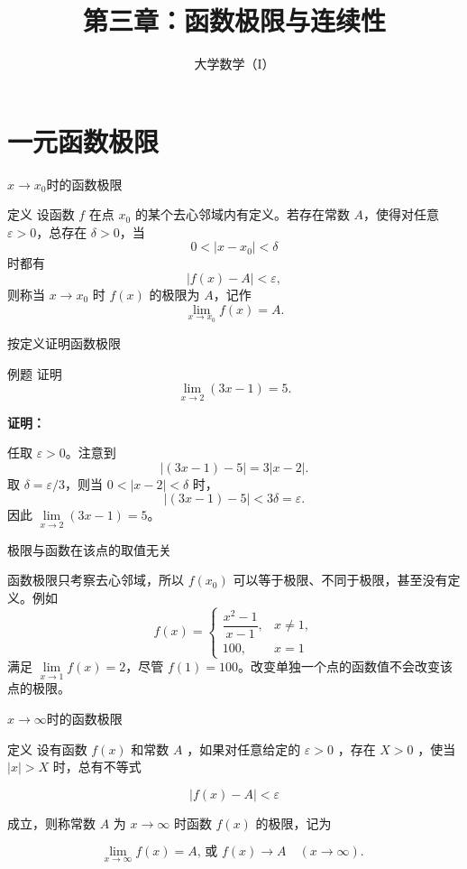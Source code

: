 \documentclass[aspectratio=169,10pt]{ctexbeamer}
\title[第三章：函数极限与连续性]{第三章：函数极限与连续性}
\author[大学数学（I）]{大学数学（I）}
\begin{document}
\begin{frame}[plain]
  \titlepage
\end{frame}






\section{一元函数极限}



\begin{frame}{$x\to x_0$时的函数极限}

	
	\begin{block}{定义}
	设函数 \(f\) 在点 \(x_0\) 的某个去心邻域内有定义。若存在常数 \(A\)，使得对任意 \(\varepsilon>0\)，总存在 \(\delta>0\)，当
	\[
	0<|x-x_0|<\delta
	\]
	时都有
	\[
	|f(x)-A|<\varepsilon,
	\]
	则称当 \(x\to x_0\) 时 \(f(x)\) 的极限为 \(A\)，记作
	\[
	\lim\limits_{x\to x_0}f(x)=A.
	\]
	\end{block}

\end{frame}

\begin{frame}{按定义证明函数极限}
	\begin{block}{例题}
	证明
	\[
	\lim\limits_{x\to2}(3x-1)=5.
	\]
	\end{block}
	\pause
	\textbf{证明：}
	
	任取 \(\varepsilon>0\)。注意到
	\[
	|(3x-1)-5|=3|x-2|.
	\]
	取 \(\delta=\varepsilon/3\)，则当 \(0<|x-2|<\delta\) 时，
	\[
	|(3x-1)-5|<3\delta=\varepsilon.
	\]
	因此 \(\lim\limits_{x\to2}(3x-1)=5\)。
	

	
\end{frame}

\begin{frame}{极限与函数在该点的取值无关}
	\begin{block}{ }
		函数极限只考察去心邻域，所以 \(f(x_0)\) 可以等于极限、不同于极限，甚至没有定义。例如
		\[
		f(x)=
		\begin{cases}
			\dfrac{x^2-1}{x-1},&x\neq1,\\
			100,&x=1
		\end{cases}
		\]
		满足 \(\lim\limits_{x\to1}f(x)=2\)，尽管 \(f(1)=100\)。改变单独一个点的函数值不会改变该点的极限。
	\end{block}
\end{frame}


\begin{frame}{$x\to \infty  $时的函数极限}
	\begin{block}{定义}
		设有函数 $f(x)$ 和常数 $A$ ，如果对任意给定的 $\varepsilon>0$ ，存在 $X>0$ ，使当 $|x|>X$ 时，总有不等式
		
		$$
		|f(x)-A|<\varepsilon
		$$
		
		成立，则称常数 $A$ 为 $x \rightarrow \infty$ 时函数 $f(x)$ 的极限，记为
		
		$$
		\lim\limits _{x \to \infty} f(x)=A \text {, 或 } f(x) \rightarrow A \quad(x \rightarrow \infty) \text {. }
		$$
	\end{block}    
\end{frame}
\end{document}
